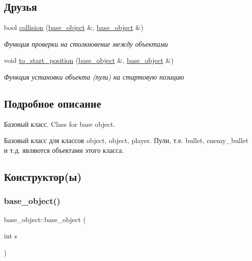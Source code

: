 \subsection*{Друзья}
\begin{DoxyCompactItemize}
\item 
bool \mbox{\hyperlink{classbase__object_a38cd5b11f00fd31a9939b0c6e293d593}{collision}} (\mbox{\hyperlink{classbase__object}{base\+\_\+object}} \&, \mbox{\hyperlink{classbase__object}{base\+\_\+object}} \&)
\begin{DoxyCompactList}\small\item\em Функция проверки на столкновение между объектами \end{DoxyCompactList}\item 
void \mbox{\hyperlink{classbase__object_a712e0cdc0ba13dc26f836adeccdc9264}{to\+\_\+start\+\_\+position}} (\mbox{\hyperlink{classbase__object}{base\+\_\+object}} \&, \mbox{\hyperlink{classbase__object}{base\+\_\+object}} \&)
\begin{DoxyCompactList}\small\item\em Функция установки объекта (пули) на стартовую позицию \end{DoxyCompactList}\end{DoxyCompactItemize}


\subsection{Подробное описание}
Базовый класс. Class for base object. 

Базовый класс для классов object, object, player. Пули, т.\+е. bullet, enemy\+\_\+bullet и т.\+д. являются объектами этого класса. 

\subsection{Конструктор(ы)}
\mbox{\label{classbase__object_aae443eac7c3fe83ea76ce4006359aaa7}} 
\subsubsection{\texorpdfstring{base\_object()}{base\_object()}}
{\footnotesize\ttfamily base\+\_\+object\+::base\+\_\+object (\begin{DoxyParamCaption}\item[{int}]{s }\end{DoxyParamCaption})}



